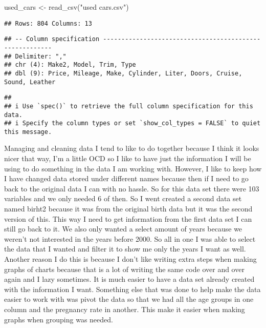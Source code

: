 \documentclass[
]{article}
\newenvironment{Shaded}{\begin{snugshade}}{\end{snugshade}}
\newcommand{\FunctionTok}[1]{\textcolor[rgb]{0.00,0.00,0.00}{#1}}
\newcommand{\NormalTok}[1]{#1}
\newcommand{\OtherTok}[1]{\textcolor[rgb]{0.56,0.35,0.01}{#1}}
\newcommand{\StringTok}[1]{\textcolor[rgb]{0.31,0.60,0.02}{#1}}
\begin{document}
\begin{Shaded}
\begin{Highlighting}[]
\NormalTok{used\_cars }\OtherTok{\textless{}{-}} \FunctionTok{read\_csv}\NormalTok{(}\StringTok{"used cars.csv"}\NormalTok{)}
\end{Highlighting}
\end{Shaded}

\begin{verbatim}
## Rows: 804 Columns: 13
\end{verbatim}

\begin{verbatim}
## -- Column specification --------------------------------------------------------
## Delimiter: ","
## chr (4): Make2, Model, Trim, Type
## dbl (9): Price, Mileage, Make, Cylinder, Liter, Doors, Cruise, Sound, Leather
\end{verbatim}

\begin{verbatim}
## 
## i Use `spec()` to retrieve the full column specification for this data.
## i Specify the column types or set `show_col_types = FALSE` to quiet this message.
\end{verbatim}

Managing and cleaning data I tend to like to do together because I think
it looks nicer that way, I'm a little OCD so I like to have just the
information I will be using to do something in the data I am working
with. However, I like to keep how I have changed data stored under
different names because then if I need to go back to the original data I
can with no hassle. So for this data set there were 103 variables and we
only needed 6 of then. So I went created a second data set named birht2
because it was from the original birth data but it was the second
version of this. This way I need to get information from the first data
set I can still go back to it. We also only wanted a select amount of
years because we weren't not interested in the years before 2000. So all
in one I was able to select the data that I wanted and filter it to show
me only the years I want as well. Another reason I do this is because I
don't like writing extra steps when making graphs of charts because that
is a lot of writing the same code over and over again and I lazy
sometimes. It is much easier to have a data set already created with the
information I want. Something else that was done to help make the data
easier to work with was pivot the data so that we had all the age groups
in one column and the pregnancy rate in another. This make it easier
when making graphs when grouping was needed.
\end{document}
